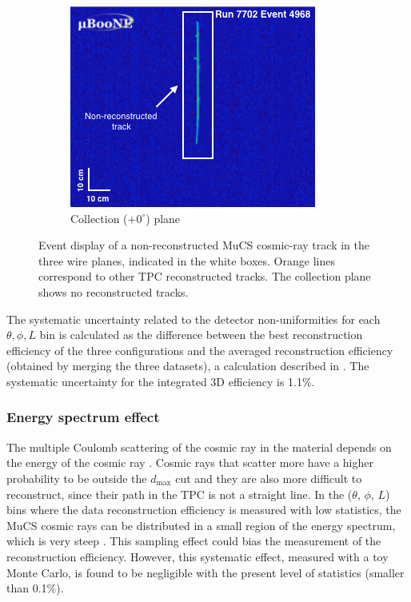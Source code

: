 \documentclass[a4paper,11pt]{article}
\begin{document}
\begin{figure}[htbp]
\begin{center}
    \begin{subfigure}{0.3\textwidth}
      \includegraphics[width=\linewidth]{figures/y.png}
      \caption{Collection ($+0^{\circ}$) plane} \label{fig:y}
    \end{subfigure}    \caption{Event display of a non-reconstructed MuCS cosmic-ray track in the three wire planes, indicated in the white boxes. Orange lines correspond to other TPC reconstructed tracks. The collection plane shows no reconstructed tracks.} \label{fig:example}
  \end{center}
\end{figure}

The systematic uncertainty related to the detector non-uniformities for each $\theta,\phi,L$ bin is calculated as the difference between the best reconstruction efficiency of the three configurations and the averaged reconstruction efficiency (obtained by merging the three datasets), a calculation described in \cite{besiii}. The systematic uncertainty for the integrated 3D efficiency is 1.1\%.

\subsubsection{Energy spectrum effect}
The multiple Coulomb scattering of the cosmic ray in the material depends on the energy of the cosmic ray \cite{pdg}. Cosmic rays that scatter more have a higher probability to be outside the $d_{\mathrm{max}}$ cut and they are also more difficult to reconstruct, since their path in the TPC is not a straight line. In the ($\theta$, $\phi$, $L$) bins where the data reconstruction efficiency is measured with low statistics, the MuCS cosmic rays can be distributed in a small region of the energy spectrum, which is very steep \cite{corsika}. This sampling effect could bias the measurement of the reconstruction efficiency. However, this systematic effect, measured with a toy Monte Carlo, is found to be negligible with the present level of statistics (smaller than 0.1\%).
\end{document}
